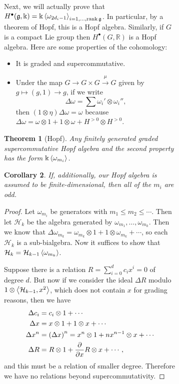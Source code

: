 \documentclass[leqno, openany]{memoir}
\newtheorem{thm}{Theorem}[section]
\newtheorem{cor}[thm]{Corollary}
\theoremstyle{definition}
\theoremstyle{remark}
\theoremstyle{plain}
\theoremstyle{definition}
\theoremstyle{remark}
\newcommand{\R}{\mathbb{R}}
\renewcommand{\k}{\Bbbk}
\newcommand{\mf}[1]{\mathfrak{#1}}
\begin{document}
\begin{figure}[H]
\begin{figure}[H]
Next, we will actually prove that $H^{\bullet}(\mf{g}, \k) = \k
\ev{\omega_{2d_i - 1}}_{i = 1, \ldots, \rank \mf{g}}$. In particular, by a
theorem of Hopf, this is a Hopf algebra. Similarly, if $G$ is a compact Lie
group then $H^{\bullet}(G, \R)$ is a Hopf algebra. Here are some properties of
the cohomology: \begin{itemize} \item It is graded and supercommutative.  \item
    Under the map $G \to G \times G \xrightarrow{\mu} G$ given by $g \mapsto
    (g, 1) \to g$, if we write \[ \Delta \omega = \sum \omega_i' \otimes
    \omega_i'', \] then $(1 \otimes \eta) \Delta \omega = \omega$ because
    $\Delta \omega = \omega \otimes 1 + 1 \otimes \omega + H^{>0} \otimes
    H^{>0}$.  \end{itemize}

\begin{thm}[Hopf] Any finitely generated graded supercommutative Hopf algebra
and the second property has the form $\k \ev{\omega_{m_i}}$.  \end{thm}

\begin{cor} If, additionally, our Hopf algebra is assumed to be
finite-dimensional, then all of the $m_i$ are odd.  \end{cor}

\begin{proof} Let $\omega_{m_i}$ be generators with $m_1 \leq m_2 \leq \cdots$.
    Then let $\mathcal{H}_k$ be the algebra generated by $\omega_{m_1}, \ldots,
    \omega_{m_k}$. Then we know that $\Delta \omega_{m_k} = \omega_{m_k}
    \otimes 1 + 1 \otimes \omega_{m_k} + \cdots$, so each $\mathcal{H}_k$ is a
    sub-bialgebra. Now it suffices to show that $\mathcal{H}_k =
    \mathcal{H}_{k-1} \ev{\omega_{m_k}}$.

    Suppose there is a relation $R = \sum_{i=0}^d c_i x^i = 0$ of degree $d$.
    But now if we consider the ideal $\Delta R$ modulo $1 \otimes
    \ev{\mathcal{H}_{k-1}, x^2}$, which does not contain $x$ for grading
    reasons, then we have \begin{align*} \Delta c_i &= c_i \otimes 1 + \cdots
        \\ \Delta x &= x \otimes 1 + 1 \otimes x + \cdots \\ \Delta x^n &=
        {(\Delta x)}^n = x^n \otimes 1 + nx^{n-1} \otimes x + \cdots \\ \Delta
        R &= R \otimes 1 + \pdv{x} R \otimes x + \cdots, \end{align*} and this
    must be a relation of smaller degree. Therefore we have no relations beyond
supercommutativity.  \end{proof}


\end{figure}
\end{figure}
\end{document}
